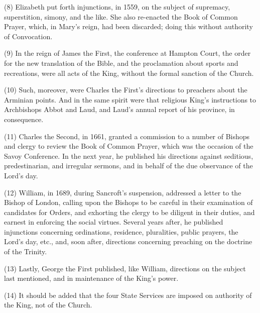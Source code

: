 (8) Elizabeth put forth
injunctions, in 1559, on the subject of supremacy, superstition,
simony, and the like. She also re-enacted the Book of Common Prayer,
which, in Mary's reign, had been discarded; doing this without
authority of Convocation.

(9) In the reign of James the
First, the conference at Hampton Court, the order for the new
translation of the Bible, and the proclamation about sports and
recreations, were all acts of the King, without the formal sanction of
the Church.

(10) Such, moreover, were
Charles the First's directions to preachers about the Arminian points.
And in the same spirit were that religious King's instructions to
Archbishops Abbot and Laud, and Laud's annual report of his province,
in consequence.

(11) Charles the Second, in
1661, granted a commission to a number of Bishops and clergy to
review the Book of Common Prayer, which was the occasion of the Savoy
Conference. In the next year, he published his directions against
seditious, predestinarian, and irregular sermons, and in behalf of the
due observance of the Lord's day.

(12) William, in 1689, during
Sancroft's suspension, addressed a letter to the Bishop of London,
calling upon the Bishops to be careful in their examination of
candidates for Orders, and exhorting the clergy to be diligent in
their duties, and earnest in enforcing the social virtues. Several
years after, he published injunctions concerning ordinations,
residence, pluralities, public prayers, the Lord's day, etc., and,
soon after, directions concerning preaching on the doctrine of the
Trinity.

(13) Lastly, George the First
published, like William, directions on the subject last mentioned, and
in maintenance of the King's power.

(14) It should be added that
the four State Services are imposed on authority of the King, not of
the Church.

